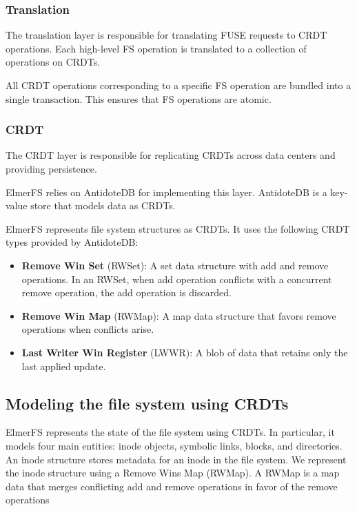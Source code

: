 \documentclass[sigconf,anonymous,10pt]{acmart}
\begin{document}
\subsubsection{Translation}
\label{sec:transaction_layer}
The translation layer is responsible for translating FUSE requests
to CRDT operations. Each high-level FS operation is translated
to a collection of operations on CRDTs.

All CRDT operations corresponding to a specific FS operation are bundled into
a single transaction. This ensures that FS operations are atomic.

\subsubsection{CRDT}

The CRDT layer is responsible for replicating CRDTs across data centers
and providing persistence.

ElmerFS relies on AntidoteDB for implementing this layer.
AntidoteDB is a key-value store that models data as CRDTs.

ElmerFS represents file system structures as CRDTs.
It uses the following CRDT types provided by AntidoteDB:
\begin{itemize}
	\item \textbf{Remove Win Set} (RWSet): A set data structure with add and
		  remove operations.
      In an RWSet, when add operation conflicts with a concurrent remove
		  operation, the add operation is discarded.
	\item \textbf{Remove Win Map} (RWMap): A map data structure that
		  favors remove operations when conflicts arise.
	\item \textbf{Last Writer Win Register} (LWWR): A blob of data that
	retains only the last applied update.
\end{itemize}

\subsection{Modeling the file system using CRDTs}

ElmerFS represents the state of the file system using CRDTs.
In particular, it models four main entities: inode objects,
symbolic links, blocks, and directories.
An inode structure stores metadata for an inode in the file system.
We represent the inode structure using a Remove Wins Map (RWMap).
A RWMap is a map data that merges conflicting add and remove operations
in favor of the remove operations
\end{document}
